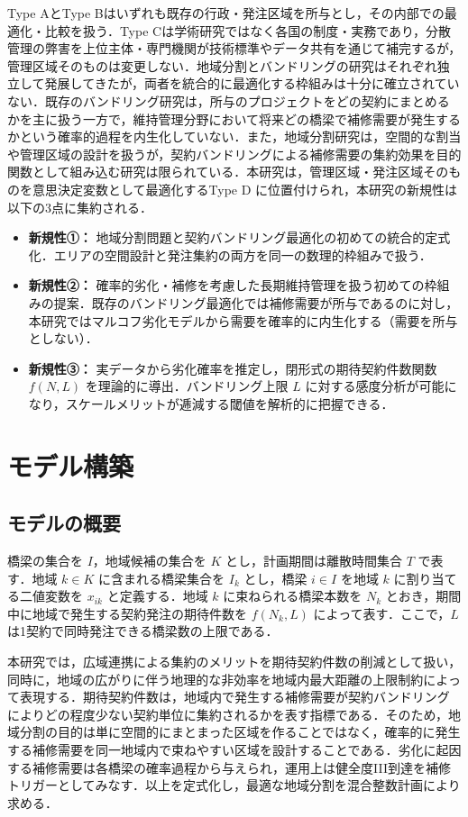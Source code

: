 \documentclass[Journal,letterpaper,InsideFigs,NoLineNumbers]{ascelike-new}
\begin{document}
Type AとType Bはいずれも既存の行政・発注区域を所与とし，その内部での最適化・比較を扱う．Type Cは学術研究ではなく各国の制度・実務であり，分散管理の弊害を上位主体・専門機関が技術標準やデータ共有を通じて補完するが，管理区域そのものは変更しない．地域分割とバンドリングの研究はそれぞれ独立して発展してきたが，両者を統合的に最適化する枠組みは十分に確立されていない．既存のバンドリング研究は，所与のプロジェクトをどの契約にまとめるかを主に扱う一方で，維持管理分野において将来どの橋梁で補修需要が発生するかという確率的過程を内生化していない．また，地域分割研究は，空間的な割当や管理区域の設計を扱うが，契約バンドリングによる補修需要の集約効果を目的関数として組み込む研究は限られている．本研究は，管理区域・発注区域そのものを意思決定変数として最適化するType D に位置付けられ，本研究の新規性は以下の3点に集約される．

\begin{itemize}
\item \textbf{新規性①：} 地域分割問題と契約バンドリング最適化の初めての統合的定式化．エリアの空間設計と発注集約の両方を同一の数理的枠組みで扱う．
\item \textbf{新規性②：} 確率的劣化・補修を考慮した長期維持管理を扱う初めての枠組みの提案．既存のバンドリング最適化では補修需要が所与であるのに対し，本研究ではマルコフ劣化モデルから需要を確率的に内生化する（需要を所与としない）．
\item \textbf{新規性③：} 実データから劣化確率を推定し，閉形式の期待契約件数関数 \(f(N,L)\) を理論的に導出．バンドリング上限 \(L\) に対する感度分析が可能になり，スケールメリットが逓減する閾値を解析的に把握できる．
\end{itemize}

\section{モデル構築}

\subsection{モデルの概要}

橋梁の集合を \(I\)，地域候補の集合を \(K\) とし，計画期間は離散時間集合 \(T\) で表す．地域 \(k\in K\) に含まれる橋梁集合を \(I_k\) とし，橋梁 \(i\in I\) を地域 \(k\) に割り当てる二値変数を \(x_{ik}\) と定義する．地域 \(k\) に束ねられる橋梁本数を \(N_k\) とおき，期間中に地域で発生する契約発注の期待件数を \(f(N_k,L)\) によって表す．ここで，\(L\) は1契約で同時発注できる橋梁数の上限である．

本研究では，広域連携による集約のメリットを期待契約件数の削減として扱い，同時に，地域の広がりに伴う地理的な非効率を地域内最大距離の上限制約によって表現する．期待契約件数は，地域内で発生する補修需要が契約バンドリングによりどの程度少ない契約単位に集約されるかを表す指標である．そのため，地域分割の目的は単に空間的にまとまった区域を作ることではなく，確率的に発生する補修需要を同一地域内で束ねやすい区域を設計することである．劣化に起因する補修需要は各橋梁の確率過程から与えられ，運用上は健全度III到達を補修トリガーとしてみなす．以上を定式化し，最適な地域分割を混合整数計画により求める．
\end{document}
